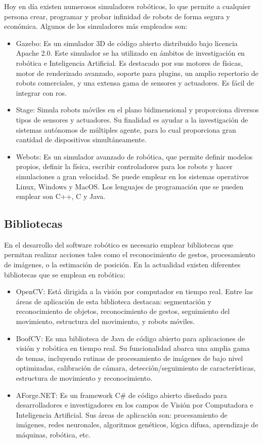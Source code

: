 Hoy en día existen numerosos simuladores robóticos, lo que permite a cualquier persona crear, programar y probar infinidad de robots de forma segura y económica. Algunos de los simuladores más empleados son:

\begin{itemize}
\item Gazebo: Es un simulador 3D de código abierto distribuido bajo licencia Apache 2.0. Este simulador se ha utilizado en ámbitos de investigación en robótica e Inteligencia Artificial. Es destacado por sus motores de físicas, motor de renderizado avanzado, soporte para plugins, un amplio repertorio de robots comerciales, y una extensa gama de sensores y actuadores. Es fácil de integrar con \acrshort{ros}.
\item Stage: Simula robots móviles en el plano bidimensional y proporciona diversos tipos de sensores y actuadores. Su finalidad es ayudar a la investigación de sistemas autónomos de múltiples agente, para lo cual proporciona gran cantidad de dispositivos simultáneamente.
\item Webots: Es un simulador avanzado de robótica, que permite definir modelos propios, definir la física, escribir controladores para los robots y hacer simulaciones a gran velocidad. Se puede emplear en los sistemas operativos Linux, Windows y MacOS. Los lenguajes de programación que se pueden emplear son  C++, C y Java.
\end{itemize}

\subsection{Bibliotecas}
En el desarrollo del software robótico es necesario emplear bibliotecas que permitan realizar acciones tales como el reconocimiento de gestos, procesamiento de imágenes, o la estimación de posición. En la actualidad existen diferentes bibliotecas que se emplean en robótica:

\begin{itemize}
\item OpenCV: Está dirigida a la visión por computador en tiempo real. Entre las áreas de aplicación de esta biblioteca destacan: segmentación y reconocimiento de objetos, reconocimiento de gestos, seguimiento del movimiento, estructura del movimiento,  y robots móviles.
\item BoofCV: Es una biblioteca de Java de código abierto para aplicaciones de visión y robótica en tiempo real. Su funcionalidad abarca una amplia gama de temas, incluyendo rutinas de procesamiento de imágenes de bajo nivel optimizadas, calibración de cámara, detección/seguimiento de características, estructura de movimiento y reconocimiento.
\item AForge.NET: Es un framework C\# de código abierto diseñado para desarrolladores e investigadores en los campos de Visión por Computadora e Inteligencia Artificial. Sus áreas de aplicación son: procesamiento de imágenes, redes neuronales, algoritmos genéticos, lógica difusa, aprendizaje de máquinas, robótica, etc.
\end{itemize}

